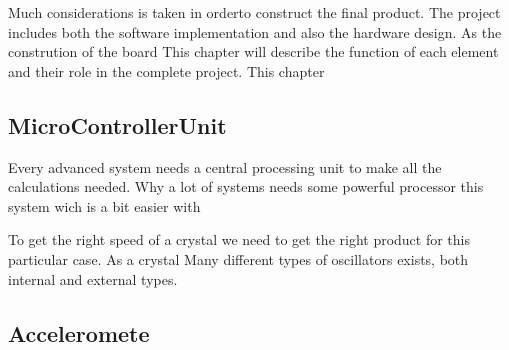 Much considerations is taken in orderto construct the final product. The project includes both the software implementation and also the hardware design. As the constrution of the board 
This chapter will describe the function of each element and their role in the complete project. 
This chapter 

\subsection{MicroControllerUnit}
Every advanced system needs a central processing unit to make all the calculations needed. Why a lot of systems needs some powerful processor this system wich is a bit easier with 

To get the right speed of a crystal we need to get the right product for this particular case. As a crystal 
Many different types of oscillators exists, both internal and external types. 

\subsection{Acceleromete}